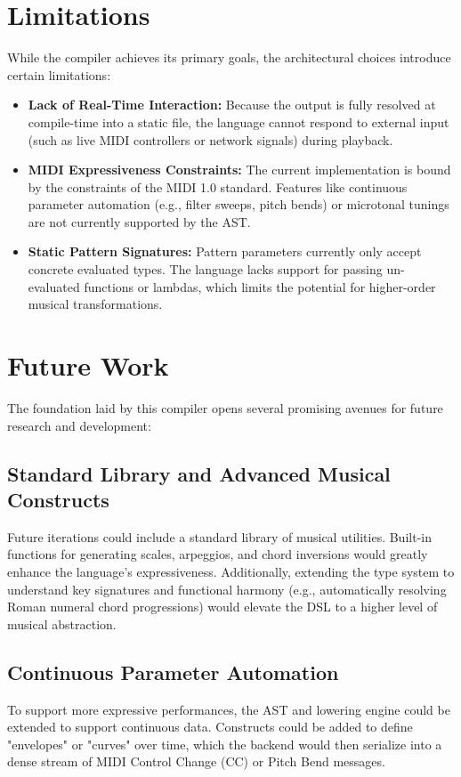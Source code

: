 \section{Limitations}

While the compiler achieves its primary goals, the architectural choices introduce certain limitations:
\begin{itemize}
  \item \textbf{Lack of Real-Time Interaction:} Because the output is fully resolved at compile-time into a
    static file, the language cannot respond to external input (such as live MIDI controllers or network
    signals) during playback.
  \item \textbf{MIDI Expressiveness Constraints:} The current implementation is bound by the constraints of
    the MIDI 1.0 standard. Features like continuous parameter automation (e.g., filter sweeps, pitch bends)
    or microtonal tunings are not currently supported by the AST.
  \item \textbf{Static Pattern Signatures:} Pattern parameters currently only accept concrete evaluated
    types. The language lacks support for passing un-evaluated functions or lambdas, which limits the
    potential for higher-order musical transformations.
\end{itemize}

\section{Future Work}

The foundation laid by this compiler opens several promising avenues for future research and development:

\subsection{Standard Library and Advanced Musical Constructs}
Future iterations could include a standard library of musical utilities. Built-in functions for generating
scales, arpeggios, and chord inversions would greatly enhance the language's expressiveness. Additionally,
extending the type system to understand key signatures and functional harmony (e.g., automatically resolving
Roman numeral chord progressions) would elevate the DSL to a higher level of musical abstraction.

\subsection{Continuous Parameter Automation}
To support more expressive performances, the AST and lowering engine could be extended to support continuous
data. Constructs could be added to define "envelopes" or "curves" over time, which the backend would then
serialize into a dense stream of MIDI Control Change (CC) or Pitch Bend messages.

